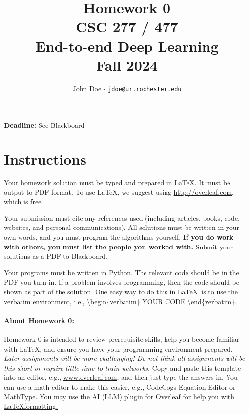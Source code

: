 \documentclass[11pt, oneside]{article}   	%
\title{Homework 0 \\ CSC 277 / 477 \\ End-to-end Deep Learning \\ Fall 2024}
\author{John Doe - \texttt{jdoe@ur.rochester.edu}}
\date{}
\begin{document}
\maketitle

\begin{center}
    \textbf{Deadline:} See Blackboard    
\end{center}


\section*{Instructions}

Your homework solution must be typed and prepared in \LaTeX. It must be output to PDF format. To use \LaTeX, we suggest using \url{http://overleaf.com}, which is free.

Your submission must cite any references used (including articles, books, code, websites, and personal communications).  All solutions must be written in your own words, and you must program the algorithms yourself. \textbf{If you do work with others, you must list the people you worked with.} Submit your solutions as a PDF to Blackboard. 


Your programs must be written in Python. The relevant code should be in the PDF you turn in. If a problem involves programming, then the code should be shown as part of the solution. One easy way to do this in \LaTeX \, is to use the verbatim environment, i.e., \textbackslash begin\{verbatim\} YOUR CODE \textbackslash end\{verbatim\}.




\paragraph{About Homework 0:} Homework 0 is intended to review prerequisite skills, help you become familiar with LaTeX, and ensure you have your programming environment prepared. \emph{Later assignments will be more challenging! Do not think all assignments will be this short or require little time to train networks.} Copy and paste this template into an editor, e.g., \url{www.overleaf.com}, and then just type the answers in. You can use a math editor to make this easier, e.g., CodeCogs Equation Editor or MathType. \hyperlink{https://blog.writefull.com/texgpt-harness-the-power-of-chatgpt-in-overleaf/}{You may use the AI (LLM) plugin for Overleaf for help you with \LaTeX formatting.}
\end{document}
